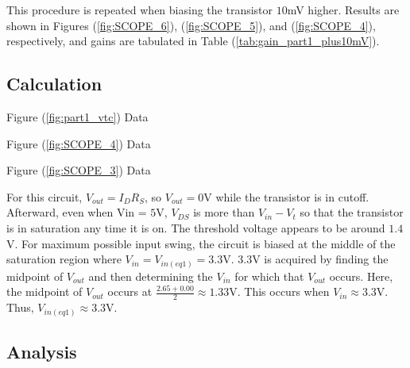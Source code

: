 This procedure is repeated when biasing the transistor $10$\si{\milli\volt} higher. Results are shown in Figures (\ref{fig:SCOPE_6}), (\ref{fig:SCOPE_5}), and (\ref{fig:SCOPE_4}), respectively, and gains are tabulated in Table (\ref{tab:gain_part1_plus10mV}).

\subsection{Calculation}

\FloatBarrier

\begin{table}[h!]
	\centering
	\caption{Figure (\ref{fig:part1_vtc}) Data}
	\label{tab:part1_vtc}
\end{table}

\FloatBarrier

\begin{table}[h!]
	\centering
	\caption{Figure (\ref{fig:SCOPE_4}) Data}
	\label{tab:gain_part1_plus10mV}
\end{table}

\FloatBarrier

\begin{table}[h!]
	\centering
	\caption{Figure (\ref{fig:SCOPE_3}) Data}
	\label{tab:gain_part1}
\end{table}

\FloatBarrier

For this circuit, $V_{out} = I_{D}R_{S}$, so $V_{out} = 0$\si{\volt} while the transistor is in cutoff. Afterward, even when Vin = $5$\si{\volt}, $V_{DS}$ is more than $V_{in} - V_{t}$ so that the transistor is in saturation any time it is on.
The threshold voltage appears to be around $1.4$\si{\volt}.
For maximum possible input swing, the circuit is biased at the middle of the saturation region where $V_{in} = V_{in(eq1)} = 3.3$\si{\volt}.
$3.3$\si{\volt} is acquired by finding the midpoint of $V_{out}$ and then determining the $V_{in}$ for which that $V_{out}$ occurs.
Here, the midpoint of $V_{out}$ occurs at $\frac{2.65 + 0.00}{2} \approx 1.33$\si{\volt}.
This occurs when $V_{in} \approx 3.3$\si{\volt}.
Thus, $V_{in(eq1)} \approx 3.3$\si{\volt}.

\subsection{Analysis}

